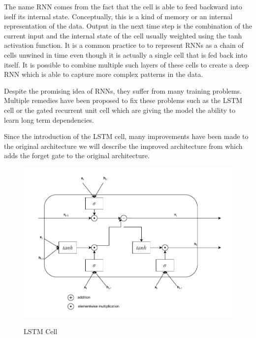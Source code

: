 The name \acl{RNN} comes from the fact that the cell is able
to feed backward into iself its internal state. Conceptually, this is a kind
of memory or an internal representation of the data. Output in the next
time step is the combination of the current input and the internal state
of the cell usually weighted using the tanh activation function. 
It is a common practice to to represent \ac{RNN}s as a chain of cells 
unwined in time even though it is actually a single cell that is fed back into itself.
It is possible to combine multiple such layers of these cells to create
a deep \ac{RNN} which is able to capture more complex patterns in the data.



Despite the promising idea of \ac{RNN}s, they suffer from many training problems.
Multiple remedies have been proposed to fix these problems such as the \ac{LSTM} cell
or the gated recurrent unit cell which are giving the model the ability to learn
long term dependencies.

Since the introduction of the \ac{LSTM} cell, many improvements have been made to the original
architecture we will describe the improved architecture from \cite{Gers2000} which
adds the forget gate to the original architecture. 

\newpage
\begin{figure}[!h]
    \centering
    \caption{\ac{LSTM} Cell}
        \includegraphics[width=1\textwidth]{Figures/LSTM.drawio.pdf}
    \label{fig:lstm_cell}
\end{figure}


